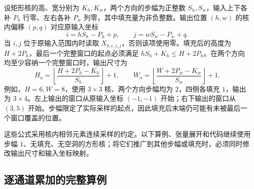 设矩形核的高、宽分别为 $K_h,K_w$，两个方向的步幅为正整数 $S_h,S_w$，输入上下各补 $P_h$ 行零、左右各补 $P_w$ 列零，其中填充量为非负整数。输出位置 $(h,w)$ 的核内偏移 $(p,q)$ 对应原输入坐标
\begin{equation}
 i=hS_h-P_h+p,\qquad j=wS_w-P_w+q.
 \label{l11:eq:stride_padding_index}
\end{equation}
当 $i,j$ 位于原输入范围内时读取 $X_{b,c,i,j}$，否则该项使用零。填充后的高度为 $H+2P_h$，最后一个完整窗口的起点必须满足 $hS_h+K_h\le H+2P_h$。在两个方向均至少容纳一个完整窗口时，输出尺寸为
\begin{equation}
 H_{\mathrm{o}}=\left\lfloor\frac{H+2P_h-K_h}{S_h}\right\rfloor+1,
 \qquad
 W_{\mathrm{o}}=\left\lfloor\frac{W+2P_w-K_w}{S_w}\right\rfloor+1.
 \label{l11:eq:stride_padding_shape}
\end{equation}
例如，$H=6,W=8$，使用 $3\times3$ 核、两个方向步幅均为 $2$，四侧各填充 $1$，输出为 $3\times4$。左上输出的窗口从原输入坐标 $(-1,-1)$ 开始；右下输出的窗口从 $(3,5)$ 开始。步幅限定了实际采样的起点，因此填充后末端仍可能有未被最后一个窗口覆盖的位置。

这些公式采用核内相邻元素连续采样的约定。以下算例、张量展开和代码继续使用步幅 $1$、无填充、无空洞的方形核；将它们推广到其他步幅或填充时，必须同时修改输出尺寸和输入坐标映射。

\subsection{逐通道累加的完整算例}
\label{l11:subsec:channel_example}

